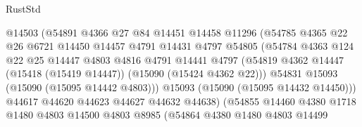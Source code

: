 \begin{lexlean}{RustStd}
\begin{coremodule}
                                @14503
                                (@54891
                                  @4366
                                  @27
                                  @84
                                  @14451
                                  @14458
                                  @11296
                                  (@54785
                                    @4365
                                    @22
                                    @26
                                    @6721
                                    @14450
                                    @14457
                                    @4791
                                    @14431
                                    @4797
                                    @54805
                                    (@54784
                                      @4363
                                      @124
                                      @22
                                      @25
                                      @14447
                                      @4803
                                      @4816
                                      @4791
                                      @14441
                                      @4797
                                      (@54819
                                        @4362
                                        @14447
                                        (@15418 (@15419 @14447))
                                        (@15090 (@15424 @4362 @22)))
                                      @54831
                                      @15093
                                      (@15090 (@15095 @14442 @4803)))
                                    @15093
                                    (@15090 (@15095 @14432 @14450)))
                                  @44617
                                  @44620
                                  @44623
                                  @44627
                                  @44632
                                  @44638)
                                (@54855
                                  @14460
                                  @4380
                                  @1718
                                  @1480
                                  @4803
                                  @14500
                                  @4803
                                  @8985
                                  (@54864
                                    @4380
                                    @1480
                                    @4803
                                    @14499

\end{coremodule}
\end{lexlean}
